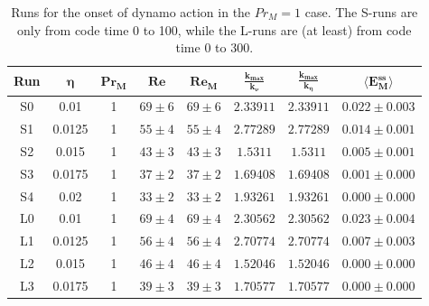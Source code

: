 \documentclass[12pt,a4paper]{report}
\begin{document}
\begin{table}[h]
\begin{center}
\begin{tabular}{||c|c|c|c|c|c|c|c||}
\hline
\textbf{Run} & $ \bm{\eta} $ & $ \bm{ Pr_M} $ & $ \bm{ Re} $ & $ \bm{ Re_M} $ & $ \bm{ \frac{k_{max}}{k_\nu}} $ & $ \bm{ \frac{k_{max}}{k_\eta}} $ & $ \bm{ \langle E_M^{ss}} \rangle $ \\ \hline
S0 & 0.01 & 1 & $ 69 \pm 6 $ & $ 69 \pm 6 $ & $ 2.33911 $ & $ 2.33911 $ & $ 0.022 \pm 0.003 $ \\ \hline
S1 & 0.0125 & 1 & $ 55 \pm 4 $ & $ 55 \pm 4 $ & $ 2.77289 $ & $ 2.77289 $ & $ 0.014 \pm 0.001 $ \\ \hline
S2 & 0.015 & 1 & $ 43 \pm 3 $ & $ 43 \pm 3 $ & $ 1.5311 $ & $ 1.5311 $ & $ 0.005 \pm 0.001 $ \\ \hline
S3 & 0.0175 & 1 & $ 37 \pm 2 $ & $ 37 \pm 2 $ & $ 1.69408 $ & $ 1.69408 $ & $ 0.001 \pm 0.000 $ \\ \hline
S4 & 0.02 & 1 & $ 33 \pm 2 $ & $ 33 \pm 2 $ & $ 1.93261 $ & $ 1.93261 $ & $ 0.000 \pm 0.000 $ \\ \hline \hline
L0 & 0.01 & 1 & $ 69 \pm 4 $ & $ 69 \pm 4 $ & $ 2.30562 $ & $ 2.30562 $ & $ 0.023 \pm 0.004 $ \\ \hline
L1 & 0.0125 & 1 & $ 56 \pm 4 $ & $ 56 \pm 4 $ & $ 2.70774 $ & $ 2.70774 $ & $ 0.007 \pm 0.003 $ \\ \hline
L2 & 0.015 & 1 & $ 46 \pm 4 $ & $ 46 \pm 4 $ & $ 1.52046 $ & $ 1.52046 $ & $ 0.000 \pm 0.000 $ \\ \hline
L3 & 0.0175 & 1 & $ 39 \pm 3 $ & $ 39 \pm 3 $ & $ 1.70577 $ & $ 1.70577 $ & $ 0.000 \pm 0.000 $ \\ \hline
\end{tabular}
\end{center}
\caption{Runs for the onset of dynamo action in the $Pr_M=1$ case. The S-runs are only from code time 0 to 100, while the L-runs are (at least) from code time 0 to 300.}
\label{tableB1}
\end{table}
\end{document}

